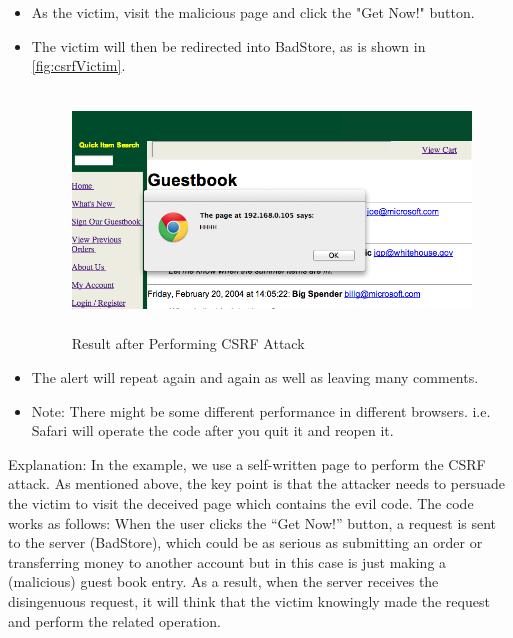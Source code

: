 \begin{enumerate}
\begin{itemize}
\begin{figure}[h!]
\begin{center}
      \end{center}
    \end{figure}
  \item As the victim, visit the malicious page and click the "Get Now!" button.
  \item The victim will then be redirected into BadStore, as is shown in \autoref{fig:csrfVictim}.
    \begin{figure}[h!]
      \caption{Result after Performing CSRF Attack}
      \label{fig:csrfVictim}
      \begin{center}\includegraphics[height=2.5in]{csrf2}
      \end{center}
    \end{figure}
  \item The alert will repeat again and again as well as leaving many comments.
  \item Note: There might be some different performance in different browsers. i.e. Safari will operate the code after you quit it and reopen it.
  \end{itemize}
  \indent Explanation: In the example, we use a self-written page to perform the CSRF attack. As mentioned above, the key point is that the attacker needs to persuade the victim to visit the deceived page which contains the evil code. The code works as follows: When the user clicks the ``Get Now!'' button, a request is sent to the server (BadStore), which could be as serious as submitting an order or transferring money to another account but in this case is just making a (malicious) guest book entry. As a result, when the server receives the disingenuous request, it will think that the victim knowingly made the request and perform the related operation.


\end{enumerate}
